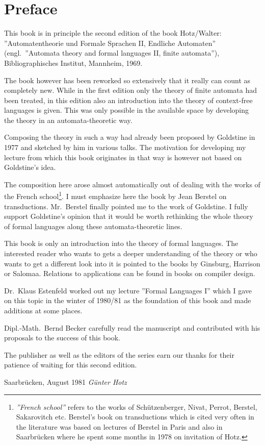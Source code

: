 \chapter*{Preface}

This book is in principle the second edition of the book Hotz/Walter:
''Automatentheorie und Formale Sprachen II, Endliche Automaten'' (engl.\
''Automata theory and formal languages II, finite automata''), Bibliographisches
Institut, Mannheim, 1969.

The book however has been reworked so extensively that it really can count as
completely new. While in the first edition only the theory of finite automata
had been treated, in this edition also an introduction into the theory of
context-free languages is given. This was only possible in the available space
by developing the theory in an automata-theoretic way.

Composing the theory in such a way had already been proposed by Goldstine
\cite{Goldstine77} in 1977 and sketched by him in various talks. The motivation
for developing my lecture from which this book originates in that way is however
not based on Goldstine's idea.

The composition here arose almost automatically out of dealing with the works of
the French school\footnote{{\em ''French school''} refers to the works of
Schützenberger, Nivat, Perrot, Berstel, Sakarovitch etc. Berstel's book on
transductions which is cited very often in the literature was based on lectures
of Berstel in Paris and also in Saarbrücken where he spent some months in 1978
on invitation of Hotz.}.
I must emphasize here the book \cite{Berstel79} by Jean Berstel on
transductions.
Mr.\ Berstel finally pointed me to the work of Goldstine. I fully support
Goldstine's opinion that it would be worth rethinking the whole theory of formal
languages along these automata-theoretic lines.

This book is only an introduction into the theory of formal languages. The
interested reader who wants to gets a deeper understanding of the theory or who
wants to get a different look into it is pointed to the books by Ginsburg,
Harrison or Salomaa. Relations to applications can be found in books on compiler
design.

Dr.\ Klaus Estenfeld worked out my lecture ''Formal Languages I'' which I gave
on this topic in the winter of 1980/81 as the foundation of this book and made
additions at some places.

Dipl.-Math.\ Bernd Becker carefully read the manuscript and contributed with his
proposals to the success of this book.

The publisher as well as the editors of the series earn our thanks for their
patience of waiting for this second edition.

\bigskip
Saarbrücken, August 1981 \hfill {\em Günter Hotz}
